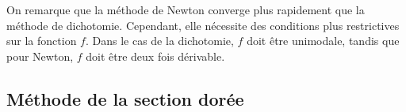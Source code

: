 {\begin{td-sol}
\begin{enumerate}
            \vspace{5pt}
            \begin{minipage}{0.48\textwidth}
                \centering
            \end{minipage}
            \begin{minipage}{0.48\textwidth}
                \centering
            \end{minipage}
            \vspace{5pt}

            On remarque que la méthode de Newton converge plus rapidement que la méthode de dichotomie. 
            Cependant, elle nécessite des conditions plus restrictives sur la fonction \(f\). 
            Dans le cas de la dichotomie, \(f\) doit être unimodale, tandis que pour Newton, 
            \(f\) doit être deux fois dérivable.
        \end{enumerate}
    \end{td-sol}
}{}

\subsection{Méthode de la section dorée}\label{exo:3}

